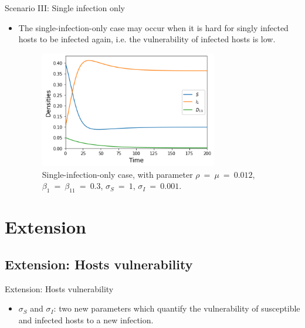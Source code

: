 \documentclass{beamer}
\begin{document}
	\begin{frame}{Scenario III: Single infection only}
		\begin{itemize}
			\item The single-infection-only case may occur when it is hard for singly infected hosts to be infected again, i.e. the vulnerability of infected hosts is low.
			\vspace{1em}
		\begin{figure}[ht]
			\label{Figure 8}
			\begin{center}
				\includegraphics[width=220pt]{single_infection_only.jpg}
			\end{center}
			\caption{Single-infection-only case, with parameter $\rho\ =\ \mu\ =\ 0.012$, $\beta_1\ =\ \beta_{11}\ =\ 0.3$, $\sigma_S\ =\ 1$, $\sigma_I\ =\ 0.001$.}
		\end{figure}
		\end{itemize}
	\end{frame}
	
	\section{Extension}
	\subsection{Extension: Hosts vulnerability}
	\begin{frame}{Extension: Hosts vulnerability}
		\begin{itemize}
			\item $\sigma_S$ and $\sigma_I$: two new parameters which quantify the vulnerability of susceptible and infected hosts to a new infection.
		\end{itemize}
	\end{frame}
\end{document}
